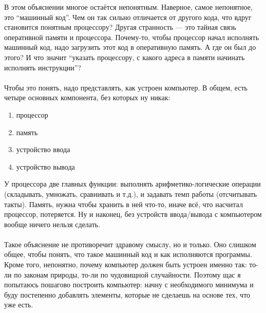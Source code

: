 \documentclass[11pt]{book}
\begin{document}
В этом объяснении многое остаётся непонятным. Наверное,
самое непонятное, это ``машинный код''. Чем он так сильно отличается
от другого кода, что вдруг становится понятным процессору?
Другая странность --- это тайная связь оперативной памяти и процессора.
Почему-то, чтобы процессор начал исполнять машинный код, надо загрузить
этот код в оперативную память. А где он был до этого? И что значит
``указать процессору, с какого адреса в памяти начинать исполнять
инструкции''?
\\ \\
Чтобы это понять, надо представлять, как устроен компьютер. В общем,
есть четыре основных компонента, без которых ну никак:
\begin{enumerate}
\item процессор
\item память
\item устройство ввода
\item устройство вывода
\end{enumerate}
У процессора две главных функции: выполнять арифметико-логические операции
(складывать, умножать, сравнивать и т.д.), и задавать темп работы
(отсчитывать такты). Память, нужна чтобы хранить в ней что-то, иначе всё, что насчитал
процессор, потеряется. Ну и наконец, без устройств ввода/вывода с компьютером вообще ничего нельзя
сделать.
\\ \\
Такое объяснение не противоречит здравому смыслу, но и только. Оно слишком
общее, чтобы понять, что такое машинный код и как исполняются программы.
Кроме того, непонятно, почему компьютер должен быть
устроен именно так: то-ли по законам природы, то-ли по чудовищной случайности.
Поэтому щас я попытаюсь пошагово построить компьютер: начну с
необходимого минимума и буду постепенно добавлять элементы,
которые не сделаешь на основе тех, что уже есть.
\end{document}
